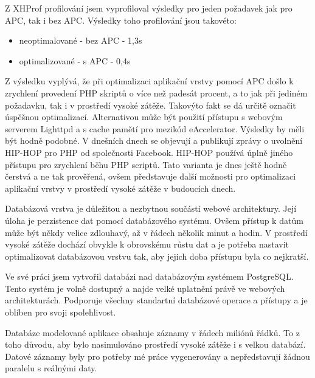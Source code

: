 \documentclass[12pt]{article}
\begin{document}
Z XHProf profilování jsem vyprofiloval výsledky pro jeden požadavek jak pro APC, tak i bez APC. Výsledky toho profilování jsou takovéto:

\begin{itemize}
\item neoptimalované - bez APC - 1,3s
\item optimalizované - s APC - 0,4s
\end{itemize}

Z výsledku vyplývá, že při optimalizaci aplikační vrstvy pomocí APC došlo k zrychlení provedení PHP skriptů o více než padesát procent, a to jak při jediném požadavku, tak i v prostředí vysoké zátěže. Takovýto fakt se dá určitě označit úspěšnou optimalizací. Alternativou může být použití přístupu s webovým serverem Lighttpd a s cache pamětí pro mezikód eAccelerator. Výsledky by měli být hodně podobné. V dnešních dnech se objevují a publikují zprávy o uvolnění HIP-HOP pro PHP od společnosti Facebook. HIP-HOP používá úplně jiného přístupu pro zrychlení běhu PHP scriptů. Tato varianta je dnes ještě hodně čerstvá a ne tak prověřená, ovšem představuje další možnosti pro optimalizaci aplikační vrstvy v prostředí vysoké zátěže v budoucích dnech.

\obrazek
{}

\obrazek
{}

\clearpage

Databázová vrstva je důležitou a nezbytnou součástí webové architektury. Její úloha je perzistence dat pomocí databázového systému. Ovšem přístup k datům může být někdy velice zdlouhavý, až v řádech několik minut a hodin. V prostředí vysoké zátěže dochází obvykle k obrovskému růstu dat a je potřeba nastavit optimalizovat databázovou vrstvu tak, aby jejich doba přístupu byla co nejkratší.

Ve své práci jsem vytvořil databázi nad databázovým systémem PostgreSQL. Tento systém je volně dostupný a najde velké uplatnění právě ve webových architekturách. Podporuje všechny standartní databázové operace a přístupy a je oblíben pro svoji spolehlivost.

Databáze modelované aplikace obsahuje záznamy v řádech miliónů řádků. To z toho důvodu, aby bylo nasimulováno prostředí vysoké zátěže i s velkou databází. Datové záznamy byly pro potřeby mé práce vygenerovány a nepředstavují žádnou paralelu s reálnými daty.
\end{document}
